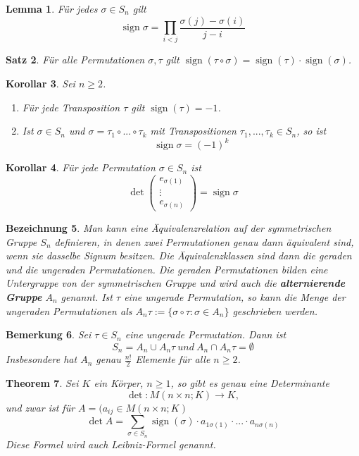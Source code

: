 \documentclass[12pt,a4paper]{article}
\theoremstyle{plain}
\newtheorem{Theorem}{Theorem}[section]
\newtheorem{Satz}[Theorem]{Satz}
\newtheorem{Lemma}[Theorem]{Lemma}
\newtheorem{Korollar}[Theorem]{Korollar}
\newtheorem{bez}[Theorem]{Bezeichnung}
\newtheorem{Bemerkung}[Theorem]{Bemerkung}
\numberwithin{equation}{section}
\begin{document}
\begin{Lemma}
Für jedes $\sigma\in S_n$ gilt
\[\operatorname{sign}\sigma = \prod_{i<j}\frac{\sigma(j)-\sigma(i)}{j-i}\]
\end{Lemma}
\begin{Satz}
Für alle Permutationen $\sigma,\tau$ gilt $\operatorname{sign}(\tau\circ\sigma)=\operatorname{sign}(\tau)\cdot\operatorname{sign}(\sigma)$.
\end{Satz}
\begin{Korollar}
Sei $n\geq 2$.
\begin{enumerate}
\item Für jede Transposition $\tau$ gilt $\operatorname{sign}(\tau)=-1$.
\item Ist $\sigma\in S_n$ und $\sigma=\tau_1\circ...\circ\tau_k$ mit Transpositionen $\tau_1,...,\tau_k\in S_n$, so ist
\[\operatorname{sign}\sigma=(-1)^k\]
\end{enumerate}
\end{Korollar}
\begin{Korollar}
Für jede Permutation $\sigma\in S_n$ ist
\[\det\begin{pmatrix} e_{\sigma(1)}\\\vdots\\e_{\sigma(n)}\end{pmatrix}=\operatorname{sign}\sigma\]
\end{Korollar}
\begin{bez}
Man kann eine Äquivalenzrelation auf der symmetrischen Gruppe $S_n$ definieren, in denen zwei Permutationen genau dann äquivalent sind, wenn sie dasselbe Signum besitzen. Die Äquivalenzklassen sind dann die geraden und die ungeraden Permutationen. Die geraden Permutationen bilden eine Untergruppe von der symmetrischen Gruppe und wird auch die \textbf{alternierende Gruppe} $A_n$ genannt. Ist $\tau$ eine ungerade Permutation, so kann die Menge der ungeraden Permutationen als $A_n \tau:=\{\sigma\circ\tau\colon\sigma\in A_n\}$ geschrieben werden.
\end{bez}
\begin{Bemerkung}
Sei $\tau\in S_n$ eine ungerade Permutation. Dann ist
\[S_n=A_n\cup A_n\tau\ und\ A_n\cap A_n\tau=\emptyset\]
Insbesondere hat $A_n$ genau $\frac{n!}2$ Elemente für alle $n\geq 2$.
\end{Bemerkung}
\begin{Theorem}
Sei $K$ ein Körper, $n\geq 1$, so gibt es genau eine Determinante
\[\det\colon M(n\times n;K)\rightarrow K,\]
und zwar ist für $A=(a_{ij}\in M(n\times n;K)$
\[\det A=\sum_{\sigma\in S_n} \operatorname{sign}(\sigma)\cdot a_{1\sigma(1)}\cdot...\cdot a_{n\sigma(n)}\]
Diese Formel wird auch Leibniz-Formel genannt.
\end{Theorem}
\end{document}
